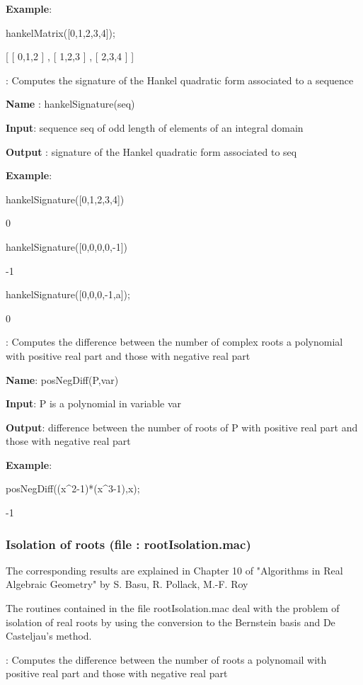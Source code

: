 \documentclass{article}
\begin{document}
{\bf Example}:
  
  hankelMatrix([0,1,2,3,4]);
  
   [ [ 0,1,2 ] , [ 1,2,3 ] , [ 2,3,4 ] ]
 

: 
  Computes the signature of the Hankel quadratic form associated to a
  sequence
  
{\bf Name} : hankelSignature(seq)
  
{\bf  Input}: sequence seq of odd length of elements of an integral domain
  
{\bf Output} : signature of the Hankel quadratic form associated to seq
  
{\bf Example}:

hankelSignature([0,1,2,3,4])

0

hankelSignature([0,0,0,0,-1])

-1


hankelSignature([0,0,0,-1,a]);

0
  

:
  Computes the difference between the number of complex roots a polynomial with
  positive real part and those with negative real part
  
{\bf Name}: posNegDiff(P,var)
  
{\bf Input}: P is a polynomial in variable var
  
{\bf Output}: difference between the number of roots of P with positive real part
  and those with negative real part
  
{\bf Example}: 

posNegDiff((x\^{}2-1)*(x\^{}3-1),x);

-1
  
  
\subsubsection{Isolation of roots (file : rootIsolation.mac)}

The corresponding results are explained in Chapter 10 of "Algorithms in Real
Algebraic Geometry" by S. Basu, R. Pollack, M.-F. Roy


The routines contained in the file rootIsolation.mac deal with the problem of isolation of
real roots by using the conversion to the Bernstein basis and De Casteljau's
method.


:
  Computes the difference between the number of roots a polynomail with
  positive real part and those with negative real part
  
\end{document}
